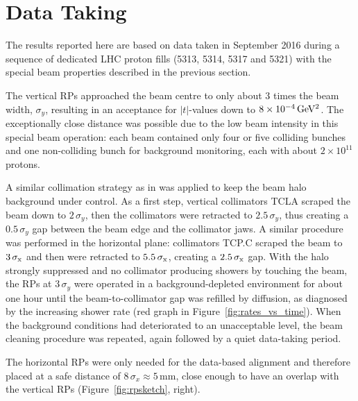 \section{Data Taking}
\label{sec:data taking}

The results reported here are based on data taken in September 2016 during a sequence of dedicated LHC proton fills (5313, 5314, 5317 and 5321) with the special beam properties described in the previous section.

The vertical RPs approached the beam centre to only about 3 times the beam width, $\sigma_{y}$, resulting in an acceptance for $|t|$-values down to $8 \times 10^{-4}\,\rm GeV^{2}$. The exceptionally close distance was possible due to the low beam intensity in this special beam operation: each beam contained only four or five colliding bunches and one non-colliding bunch for background monitoring, each with about $2\times 10^{11}$ protons.

A similar collimation strategy as in \cite{totem-8tev-1km} was applied to keep the beam halo background under control. As a first step, vertical collimators TCLA scraped the beam down to $2\,\sigma_{y}$, then the collimators were retracted to $2.5\,\sigma_{y}$, thus creating a $0.5\,\sigma_{y}$ gap between the beam edge and the collimator jaws. A similar procedure was performed in the horizontal plane: collimators TCP.C scraped the beam to $3\,{\rm \sigma_{x}}$ and then were retracted to $5.5\,{\rm \sigma_{x}}$, creating a $2.5\,{\rm \sigma_x}$ gap. With the halo strongly suppressed and no collimator producing showers by touching the beam, the RPs at $3\,\sigma_{y}$ were operated in a background-depleted environment for about one hour until the beam-to-collimator gap was refilled by diffusion, as diagnosed by the increasing shower rate (red graph in Figure~\ref{fig:rates_vs_time}). When the background conditions had deteriorated to an unacceptable level, the beam cleaning procedure was repeated, again followed by a quiet data-taking period.




The horizontal RPs were only needed for the data-based alignment and therefore placed at a safe distance of $8\,\sigma_{x} \approx 5$\,mm, close enough to have an overlap with the vertical RPs (Figure~\ref{fig:rpsketch}, right).

